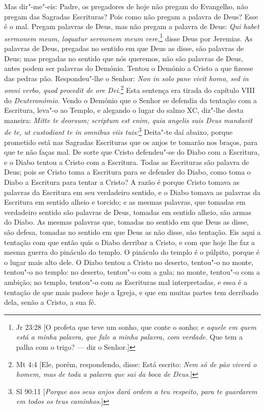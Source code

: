 Mas dir"-me"-eis: Padre, os pregadores de hoje não pregam do Evangelho,
não pregam das Sagradas Escrituras? Pois como não
pregam a palavra de Deus? Esse é o mal. Pregam palavras de Deus, mas
não pregam a palavra de Deus: \emph{Qui habet sermonem meum, loquatur
sermonem meum vere},\footnote{Jr 23:28 [O profeta que teve um sonho, que conte o sonho; e \emph{aquele em quem está a minha palavra, que fale a minha palavra, com verdade}. Que tem a palha com o trigo? --- diz o Senhor.]} disse Deus por Jeremias. As palavras de Deus,
pregadas no sentido em que Deus as disse, são palavras de Deus; mas
pregadas no sentido que nós queremos, não são palavras de Deus, antes
podem ser palavras do Demónio. Tentou o Demónio a Cristo a que fizesse
das pedras pão. Respondeu"-lhe o Senhor: \emph{Non in solo pane vivit
homo, sed in omni verbo, quod procedit de ore Dei.}\footnote{Mt 4:4 [Ele, porém, respondendo, disse: Está escrito: \emph{Nem só de pão viverá o homem, mas de toda
a palavra que sai da boca de Deus}.]} Esta sentença era
tirada do capítulo VIII do \emph{Deuteronómio}. Vendo o Demónio que o
Senhor se defendia da tentação com a Escritura, leva"-o ao Templo, e
alegando o lugar do salmo XC, diz"-lhe desta maneira: \emph{Mitte te
deorsum; scriptum est enim, quia angelis suis Deus mandavit de te, ut
custodiant te in omnibus viis tuis:}\footnote{Sl 90:11 [\emph{Porque aos seus anjos dará ordem a teu respeito, para te guardarem em todos os teus caminhos}.]} Deita"-te daí abaixo, porque prometido está nas Sagradas Escrituras que os anjos te tomarão nos
braços, para que te não faças mal. De sorte que Cristo defendeu"-se do
Diabo com a Escritura, e o Diabo tentou a Cristo com a Escritura. Todas
as Escrituras são palavra de Deus; pois se Cristo toma a Escritura para
se defender do Diabo, como toma o Diabo a Escritura para tentar a
Cristo? A razão é porque Cristo tomava as palavras da Escritura em
seu verdadeiro sentido, e o Diabo tomava as palavras da Escritura em
sentido alheio e torcido; e as mesmas palavras, que tomadas em
verdadeiro sentido são palavras de Deus, tomadas em sentido alheio,
são armas do Diabo. As mesmas palavras que, tomadas no sentido em que
Deus as disse, são defesa, tomadas no sentido em que Deus as não disse,
são tentação. Eis aqui a tentação com que então quis o Diabo derribar a
Cristo, e com que hoje lhe faz a mesma guerra do pináculo do templo. O
pináculo do templo é o púlpito, porque é o lugar mais alto dele. O Diabo
tentou a Cristo no deserto, tentou"-o no monte, tentou"-o no templo: no
deserto, tentou"-o com a gula; no monte, tentou"-o com a ambição; no
templo, tentou"-o com as Escrituras mal interpretadas, e essa é a
tentação de que mais padece hoje a Igreja, e que em muitas partes tem
derribado dela, senão a Cristo, a sua fé.

